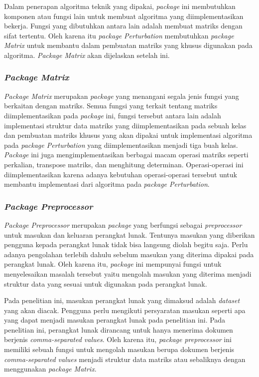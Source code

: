 Dalam penerapan algoritma teknik yang dipakai, \textit{package} ini membutuhkan komponen atau fungsi lain untuk membuat algoritma yang diimplementasikan bekerja. Fungsi yang dibutuhkan antara lain adalah membuat matriks dengan sifat tertentu. Oleh karena itu \textit{package Perturbation} membutuhkan \textit{package Matrix} untuk membantu dalam pembuatan matriks yang khusus digunakan pada algoritma. \textit{Package Matrix} akan dijelaskan setelah ini.

\subsubsection{\textit{Package Matrix}}
\label{subsubsec:package-matrix}

\textit{Package Matrix} merupakan \textit{package} yang menangani segala jenis fungsi yang berkaitan dengan matriks. Semua fungsi yang terkait tentang matriks diimplementasikan pada \textit{package} ini, fungsi tersebut antara lain adalah implementasi struktur data matriks yang diimplementasikan pada sebuah kelas dan pembuatan matriks khusus yang akan dipakai untuk implementasi algoritma pada \textit{package Perturbation} yang diimplementasikan menjadi tiga buah kelas. \textit{Package} ini juga mengimplementasikan berbagai macam operasi matriks seperti perkalian, transpose matriks, dan menghitung determinan. Operasi-operasi ini diimplementasikan karena adanya kebutuhan operasi-operasi tersebut untuk membantu implementasi dari algoritma pada \textit{package Perturbation}.

\subsubsection{\textit{Package Preprocessor}}
\label{subsubsec:package-preprocessor}

\textit{Package Preprocessor} merupakan \textit{package} yang berfungsi sebagai \textit{preprocessor} untuk masukan dan keluaran perangkat lunak. Tentunya masukan yang diberikan pengguna kepada perangkat lunak tidak bisa langsung diolah begitu saja. Perlu adanya pengolahan terlebih dahulu sebelum masukan yang diterima dipakai pada perangkat lunak. Oleh karena itu, \textit{package} ini mempunyai fungsi untuk menyelesaikan masalah tersebut yaitu mengolah masukan yang diterima menjadi struktur data yang sesuai untuk digunakan pada perangkat lunak.

Pada penelitian ini, masukan perangkat lunak yang dimaksud adalah \textit{dataset} yang akan diacak. Pengguna perlu mengikuti persyaratan masukan seperti apa yang dapat menjadi masukan perangkat lunak pada penelitian ini. Pada penelitian ini, perangkat lunak dirancang untuk hanya menerima dokumen berjenis \textit{comma-separated values}. Oleh karena itu, \textit{package preprocessor} ini memiliki sebuah fungsi untuk mengolah masukan berupa dokumen berjenis \textit{comma-separated values} menjadi struktur data matriks atau sebaliknya dengan menggunakan \textit{package Matrix}.

